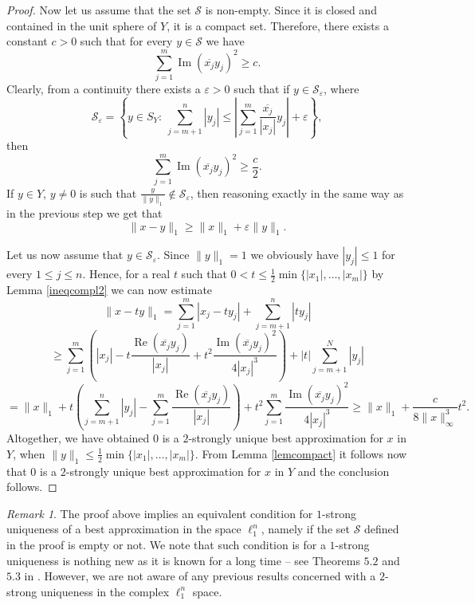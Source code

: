 \documentclass[12pt, reqno]{amsart}
\theoremstyle{definition}
\theoremstyle{remark}
\newtheorem{remark}[twr]{Remark}
\numberwithin{equation}{section}
\DeclareMathOperator{\re}{Re}
\DeclareMathOperator{\im}{Im}
\begin{document}
\begin{proof}
Now let us assume that the set $\mathcal{S}$ is non-empty. Since it is closed and contained in the unit sphere of $Y$, it is a compact set. Therefore, there exists a constant $c>0$ such that for every $y \in \mathcal{S}$ we have
$$\sum_{j=1}^{m} \im(\overline{x_j}y_j)^2 \geq c.$$
Clearly, from a continuity there exists a $\varepsilon>0$ such that if $y \in \mathcal{S}_{\varepsilon}$, where
$$\mathcal{S}_{\varepsilon} = \left \{ y \in S_Y : \ \sum_{j=m+1}^{n} |y_j| \leq \left | \sum_{j=1}^{m} \frac{\overline{x_j}}{|x_j|} y_j \right | + \varepsilon \right \},$$
then
$$\sum_{j=1}^{m} \im(\overline{x_j}y_j)^2 \geq \frac{c}{2}.$$
If $y \in Y$, $y \neq 0$ is such that $\frac{y}{\|y\|_1} \not \in \mathcal{S}_{\varepsilon}$, then reasoning exactly in the same way as in the previous step we get that
$$\|x-y\|_1 \geq \|x\|_1 + \varepsilon\|y\|_1.$$

Let us now assume that $y  \in \mathcal{S}_{\varepsilon}$. Since $\|y\|_1 = 1$ we obviously have $|y_j| \leq 1$ for every $1 \leq j \leq n$. Hence, for a real $t$ such that $0 < t \leq \frac{1}{2} \min \{|x_1|, \ldots, |x_m|\}$ by Lemma \ref{ineqcompl2} we can now estimate
$$\|x-ty\|_1 = \sum_{j=1}^{m} |x_j - ty_j| + \sum_{j=m+1}^{n} |ty_j|$$
$$\geq \sum_{j=1}^{m} \left ( |x_j| -  t \frac{\re(\overline{x_j}y_j)}{|x_j|} + t^2 \frac{\im(\overline{x_j}y_j)^2}{4|x_j|^3} \right ) + |t|\sum_{j=m+1}^{N} |y_j|$$
$$=\|x\|_1 + t \left (\sum_{j=m+1}^{n} |y_j| - \sum_{j=1}^{m} \frac{\re(\overline{x_j}y_j)}{|x_j|} \right ) + t^2\sum_{j=1}^{m}\frac{\im(\overline{x_j}y_j)^2}{4|x_j|^3} \geq \|x\|_1 + \frac{c}{8\|x\|_{\infty}^3}t^2.$$
Altogether, we have obtained $0$ is a $2$-strongly unique best approximation for $x$ in $Y$, when $\|y\|_{1} \leq \frac{1}{2} \min \{|x_1|, \ldots, |x_m|\}$. From Lemma \ref{lemcompact} it follows now that $0$ is a $2$-strongly unique best approximation for $x$ in $Y$ and the conclusion follows.
\end{proof}

\begin{remark}
The proof above implies an equivalent condition for $1$-strong uniqueness of a best approximation in the space $\ell_1^n$, namely if the set $\mathcal{S}$ defined in the proof is empty or not. We note that such condition is for a $1$-strong uniqueness is nothing new as it is known for a long time -- see Theorems $5.2$ and $5.3$ in \cite{survey}. However, we are not aware of any previous results concerned with a $2$-strong uniqueness in the complex $\ell_1^n$ space.
\end{remark}
\end{document}
